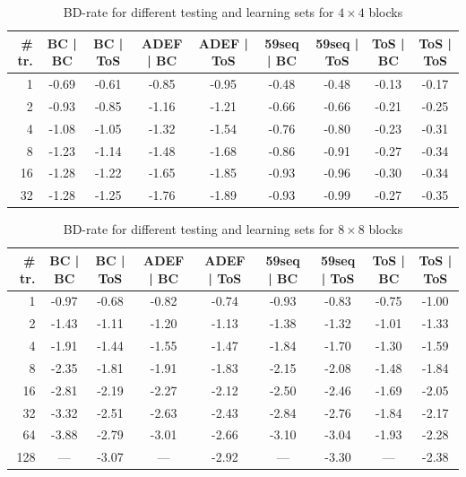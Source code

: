 \documentclass[11pt,a4paper,openright,twoside]{book}
\numberwithin{equation}{section} %
\numberwithin{figure}{section} %
\numberwithin{table}{section} %
\begin{document}
\begin{table}[tb]
	\centering
	\small
	\begin{tabularx}{\linewidth}{r|cc|cc|cc|cc}
		\# tr. & BC | BC & BC | ToS & ADEF | BC & ADEF | ToS & 59seq | BC &
		59seq | ToS & ToS | BC & ToS | ToS \\
		\hline\hline
		1  & -0.69 & -0.61 & -0.85 & -0.95 & -0.48 & -0.48 & -0.13 & -0.17 \\
		2  & -0.93 & -0.85 & -1.16 & -1.21 & -0.66 & -0.66 & -0.21 & -0.25 \\
		4  & -1.08 & -1.05 & -1.32 & -1.54 & -0.76 & -0.80 & -0.23 & -0.31 \\
		8  & -1.23 & -1.14 & -1.48 & -1.68 & -0.86 & -0.91 & -0.27 & -0.34 \\
		16 & -1.28 & -1.22 & -1.65 & -1.85 & -0.93 & -0.96 & -0.30 & -0.34 \\
		32 & -1.28 & -1.25 & -1.76 & -1.89 & -0.93 & -0.99 & -0.27 & -0.35 \\
	\end{tabularx}
	\caption{\acs{BD}-rate for different testing and learning sets for
	$4\times4$ blocks}
	\label{tab:residuals_independence_4}
\end{table}

\begin{table}[tb]
	\centering
	\small
	\begin{tabularx}{\linewidth}{r|cc|cc|cc|cc}
		\# tr. & BC | BC & BC | ToS & ADEF | BC & ADEF | ToS & 59seq | BC &
		59seq | ToS & ToS | BC & ToS | ToS \\
		\hline\hline
		1   & -0.97 & -0.68 & -0.82 & -0.74 & -0.93 & -0.83 & -0.75 & -1.00 \\
		2   & -1.43 & -1.11 & -1.20 & -1.13 & -1.38 & -1.32 & -1.01 & -1.33 \\
		4   & -1.91 & -1.44 & -1.55 & -1.47 & -1.84 & -1.70 & -1.30 & -1.59 \\
		8   & -2.35 & -1.81 & -1.91 & -1.83 & -2.15 & -2.08 & -1.48 & -1.84 \\
		16  & -2.81 & -2.19 & -2.27 & -2.12 & -2.50 & -2.46 & -1.69 & -2.05 \\
		32  & -3.32 & -2.51 & -2.63 & -2.43 & -2.84 & -2.76 & -1.84 & -2.17 \\
		64  & -3.88 & -2.79 & -3.01 & -2.66 & -3.10 & -3.04 & -1.93 & -2.28 \\
		128 & ---   & -3.07 & ---   & -2.92 & ---   & -3.30 & ---   & -2.38 \\
	\end{tabularx}
	\caption{\acs{BD}-rate for different testing and learning sets for
	$8\times8$ blocks}
	\label{tab:residuals_independence_8}
\end{table}
\end{document}

